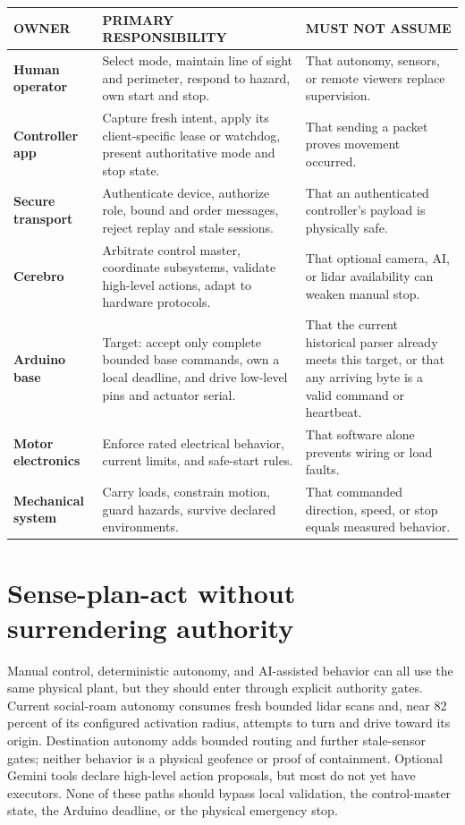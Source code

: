 \documentclass[10pt,openany]{book}
\begin{document}
\begin{tabularx}{\textwidth}{>{\robcondensed\bfseries}p{1.32in} X X}
\toprule
OWNER & PRIMARY RESPONSIBILITY & MUST NOT ASSUME\\
\midrule
Human operator & Select mode, maintain line of sight and perimeter, respond to hazard, own start and stop. & That autonomy, sensors, or remote viewers replace supervision.\\
Controller app & Capture fresh intent, apply its client-specific lease or watchdog, present authoritative mode and stop state. & That sending a packet proves movement occurred.\\
Secure transport & Authenticate device, authorize role, bound and order messages, reject replay and stale sessions. & That an authenticated controller's payload is physically safe.\\
Cerebro & Arbitrate control master, coordinate subsystems, validate high-level actions, adapt to hardware protocols. & That optional camera, AI, or lidar availability can weaken manual stop.\\
Arduino base & Target: accept only complete bounded base commands, own a local deadline, and drive low-level pins and actuator serial. & That the current historical parser already meets this target, or that any arriving byte is a valid command or heartbeat.\\
Motor electronics & Enforce rated electrical behavior, current limits, and safe-start rules. & That software alone prevents wiring or load faults.\\
Mechanical system & Carry loads, constrain motion, guard hazards, survive declared environments. & That commanded direction, speed, or stop equals measured behavior.\\
\bottomrule
\end{tabularx}

\section{Sense-plan-act without surrendering authority}

\ROBSimpleSystemDiagram

Manual control, deterministic autonomy, and AI-assisted behavior can all use the same physical plant, but they should enter through explicit authority gates. \Experimental\quad Current social-roam autonomy consumes fresh bounded lidar scans and, near 82 percent of its configured activation radius, attempts to turn and drive toward its origin. Destination autonomy adds bounded routing and further stale-sensor gates; neither behavior is a physical geofence or proof of containment. Optional Gemini tools declare high-level action proposals, but most do not yet have executors. None of these paths should bypass local validation, the control-master state, the Arduino deadline, or the physical emergency stop.
\end{document}
